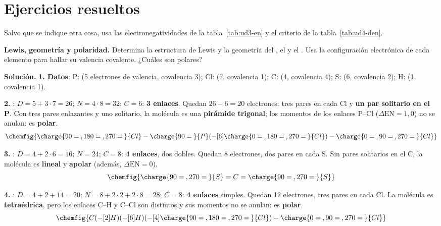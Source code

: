 
\section{Ejercicios resueltos}\label{sec:ud4-resueltos}

Salvo que se indique otra cosa, usa las electronegatividades de la tabla~\ref{tab:ud3-en} y el criterio de la
tabla~\ref{tab:ud4-den}.

\begin{example}
    \textbf{Lewis, geometría y polaridad.} Determina la estructura de Lewis y la geometría del , el  y el
    . Usa la configuración electrónica de cada elemento para hallar su valencia covalente. ¿Cuáles son polares?

    \textbf{Solución.} \textbf{1. Datos}: P:  (5 electrones de valencia, covalencia 3); Cl:
     (7, covalencia 1); C:  (4, covalencia 4); S:  (6,
    covalencia 2); H:  (1, covalencia 1).

    \textbf{2. }: \(D = 5 + 3 \cdot 7 = 26\); \(N = 4 \cdot 8 = 32\); \(C = 6\): \textbf{3 enlaces}. Quedan
    \(26 - 6 = 20\) electrones: tres pares en cada Cl y \textbf{un par solitario en el P}. Con tres pares enlazantes y uno
    solitario, la molécula es una \textbf{pirámide trigonal}; los momentos de los enlaces P--Cl (\(\Delta\mathrm{EN} = 1{,}0\)) no
    se anulan: es \textbf{polar}.
    \[ \chemfig{\charge{90=\:,180=\:,270=\:}{Cl}-\charge{90=\:}{P}(-[6]\charge{0=\:,180=\:,270=\:}{Cl})-\charge{0=\:,90=\:,270=\:}{Cl}} \]

    \textbf{3. }: \(D = 4 + 2 \cdot 6 = 16\); \(N = 24\); \(C = 8\): \textbf{4 enlaces}, dos dobles. Quedan 8 electrones,
    dos pares en cada S. Sin pares solitarios en el C, la molécula es \textbf{lineal} y \textbf{apolar} (además,
    \(\Delta\mathrm{EN} = 0\)).
    \[ \chemfig{\charge{90=\:,270=\:}{S}=C=\charge{90=\:,270=\:}{S}} \]

    \textbf{4. }: \(D = 4 + 2 + 14 = 20\); \(N = 8 + 2 \cdot 2 + 2 \cdot 8 = 28\); \(C = 8\): \textbf{4 enlaces}
    simples. Quedan 12 electrones, tres pares en cada Cl. La molécula es \textbf{tetraédrica}, pero los enlaces C--H y C--Cl son
    distintos y sus momentos no se anulan: es \textbf{polar}.
    \[ \chemfig{C(-[2]H)(-[6]H)(-[4]\charge{90=\:,180=\:,270=\:}{Cl})-\charge{0=\:,90=\:,270=\:}{Cl}} \]
\end{example}

